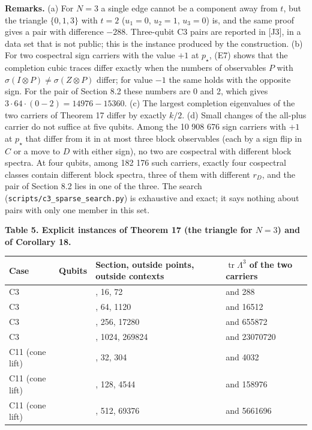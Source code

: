 \documentclass[11pt,a4paper]{article}
\begin{document}
\textbf{Remarks.} (a) For \(N=3\) a single edge cannot be a component away from \(t\), but the triangle
\(\{0,1,3\}\) with \(t=2\) (\(u_1=0\), \(u_2=1\), \(u_3=0\)) is, and the same proof gives a pair with difference
\(-288\). Three-qubit C3 pairs are reported in {[}J3{]}, in a data set that is not public; this is the instance produced by the
construction. (b) For two cospectral sign carriers with the value \(+1\) at \(p_\star\), (E7) shows that the
completion cubic traces differ exactly when the numbers of observables \(P\) with
\(\sigma(I\otimes P)\neq\sigma(Z\otimes P)\) differ; for value \(-1\) the same holds with the opposite sign. For the
pair of Section 8.2 these numbers are 0 and 2, which gives \(3\cdot64\cdot(0-2)=14976-15360\). (c) The
largest completion eigenvalues of the two carriers of Theorem 17 differ by exactly \(k/2\). (d) Small
changes of the all-plus carrier do not suffice at five qubits. Among the 10 908 676 sign carriers with
\(+1\) at \(p_\star\) that differ from it in at most three block observables (each by a sign flip in \(C\) or a
move to \(D\) with either sign), no two are cospectral with different block spectra. At four qubits,
among 182 176 such carriers, exactly four cospectral classes contain different block spectra, three of
them with different \(r_D\), and the pair of Section 8.2 lies in one of the three. The search
(\nolinkurl{scripts/c3_sparse_search.py}) is exhaustive and exact; it says nothing about pairs with only one
member in this set.

\textbf{Table 5. Explicit instances of Theorem 17 (the triangle for \(N=3\)) and of Corollary 18.}

{\def\LTcaptype{none} %
{\small
\begin{longtable}[]{@{}>{\raggedright\arraybackslash}p{}>{\raggedright\arraybackslash}p{}>{\raggedright\arraybackslash}p{}>{\raggedright\arraybackslash}p{}@{}}
\toprule\noalign{}
Case & Qubits & Section, outside points, outside contexts & \(\operatorname{tr}\Lambda^3\) of the two carriers \\
\midrule\noalign{}
\endhead
\bottomrule\noalign{}
\endlastfoot
C3 & 3 & 19, 16, 72 & 0 and 288 \\
C3 & 4 & 71, 64, 1120 & 15744 and 16512 \\
C3 & 5 & 271, 256, 17280 & 649728 and 655872 \\
C3 & 6 & 1055, 1024, 269824 & 23021568 and 23070720 \\
C11 (cone lift) & 4 & 39, 32, 304 & 1728 and 4032 \\
C11 (cone lift) & 5 & 143, 128, 4544 & 152832 and 158976 \\
C11 (cone lift) & 6 & 543, 512, 69376 & 5612544 and 5661696 \\
\end{longtable}
}
}
\end{document}
